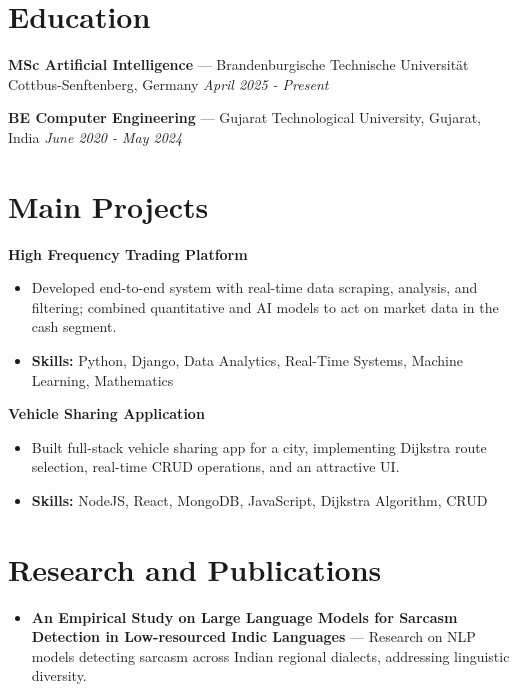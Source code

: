\documentclass[a4paper,10pt]{article}
\begin{document}
\section*{Education}
\textbf{MSc Artificial Intelligence} — Brandenburgische Technische Universität Cottbus-Senftenberg, Germany \hfill \textit{April 2025 - Present}\par
\vspace{1.5pt}
\textbf{BE Computer Engineering} — Gujarat Technological University, Gujarat, India \hfill \textit{June 2020 - May 2024}\par

\section*{Main Projects}
\textbf{High Frequency Trading Platform}\par
\vspace{1pt}
\begin{itemize}
  \item Developed end-to-end system with real-time data scraping, analysis, and filtering; combined quantitative and AI models to act on market data in the cash segment.
  \item \textbf{Skills:} Python, Django, Data Analytics, Real-Time Systems, Machine Learning, Mathematics
\end{itemize}
\vspace{3pt}
\textbf{Vehicle Sharing Application}\par
\vspace{1pt}
\begin{itemize}
  \item Built full-stack vehicle sharing app for a city, implementing Dijkstra route selection, real-time CRUD operations, and an attractive UI.
  \item \textbf{Skills:} NodeJS, React, MongoDB, JavaScript, Dijkstra Algorithm, CRUD
\end{itemize}

\section*{Research and Publications}
\begin{itemize}
\item \textbf{An Empirical Study on Large Language Models for Sarcasm Detection in Low-resourced Indic Languages} — Research on NLP models detecting sarcasm across Indian regional dialects, addressing linguistic diversity.
\end{itemize}
\end{document}
